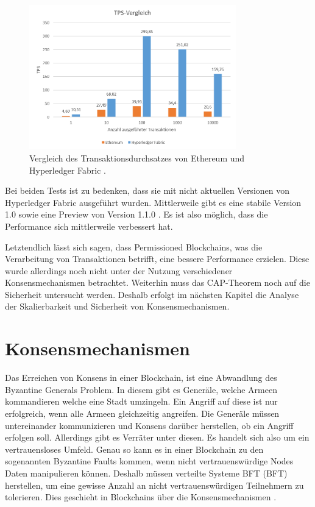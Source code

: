 \begin{figure}[!htbp]
  \centering
    \includegraphics[width=0.8\textwidth,angle=0]{images/TPS-ethvshyp}
     \caption{Vergleich des Transaktionsdurchsatzes von Ethereum und Hyperledger Fabric \cite{PongnumkulPerformanceAnalysisPrivate2017}.}
    \label{fig:tps-ethereum-vs-hyperledger}
\end{figure} 

Bei beiden Tests ist zu bedenken, dass sie mit nicht aktuellen Versionen von Hyperledger Fabric ausgeführt wurden. Mittlerweile gibt es eine stabile Version 1.0 sowie eine Preview von Version 1.1.0 \cite{HyperledgerFabricTeamHyperledgerFabricReleases2018}. Es ist also möglich, dass die Performance sich mittlerweile verbessert hat.

Letztendlich lässt sich sagen, dass Permissioned Blockchains, was die Verarbeitung von Transaktionen betrifft, eine bessere Performance erzielen. Diese wurde allerdings noch nicht unter der Nutzung verschiedener Konsensmechanismen betrachtet. Weiterhin muss das CAP-Theorem noch auf die Sicherheit untersucht werden. Deshalb erfolgt im nächsten Kapitel die Analyse der Skalierbarkeit und Sicherheit von Konsensmechanismen.

\section{Konsensmechanismen}
\label{sec:eval-konsens}
Das Erreichen von Konsens in einer Blockchain, ist eine Abwandlung des Byzantine Generals Problem. In diesem gibt es Generäle, welche Armeen kommandieren welche eine Stadt umzingeln. Ein Angriff auf diese ist nur erfolgreich, wenn alle Armeen gleichzeitig angreifen. Die Generäle müssen untereinander kommunizieren und Konsens darüber herstellen, ob ein Angriff erfolgen soll. Allerdings gibt es Verräter unter diesen. Es handelt sich also um ein vertrauensloses Umfeld. Genau so kann es in einer Blockchain zu den sogenannten Byzantine Faults kommen, wenn nicht vertrauenswürdige Nodes Daten manipulieren können. Deshalb müssen verteilte Systeme \acl{BFT} (\acs{BFT}) herstellen, um eine gewisse Anzahl an nicht vertrauenswürdigen Teilnehmern zu tolerieren. Dies geschieht in Blockchains über die Konsensmechanismen \cite{ZhengBlockchainChallengesOpportunities2017}.

